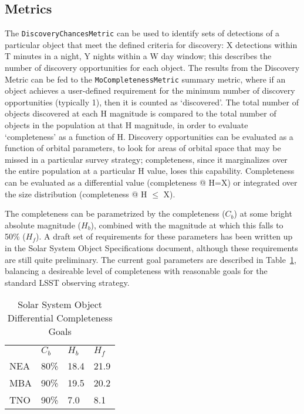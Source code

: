 
\subsection{Metrics}
\label{sec:\secname:metrics}

The {\tt DiscoveryChancesMetric} can be used to identify sets of
detections of a particular object that meet the defined criteria for
discovery: X detections within T minutes in a night, Y nights within a
W day window; this describes the number of discovery opportunities for
each object. The results from the Discovery Metric can be fed to the
{\tt MoCompletenessMetric} summary metric, where if an object achieves
a user-defined requirement for the minimum number of discovery
opportunities (typically 1), then it is counted as `discovered'.  The
total number of objects discovered at each H magnitude is compared to
the total number of objects in the population at that H magnitude, in
order to evaluate `completeness' as a function of H. Discovery
opportunities can be evaluated as a function of orbital parameters, to
look for areas of orbital space that may be missed in a particular
survey strategy; completeness, since it marginalizes over the entire
population at a particular H value, loses this
capability. Completeness can be evaluated as a differential value
(completeness @ H=X) or integrated over the size distribution
(completeness @ H $\leq$ X).

The completeness can be parametrized by the completeness ($C_b$) at
some bright absolute magnitude ($H_b$), combined with the magnitude at
which this falls to 50\% ($H_f$). A draft set of requirements for
these parameters has been written up in the Solar System Object
Specifications document, although these requirements are still quite
preliminary. The current goal parameters are described in Table~\ref{ssoreqs},
balancing a desireable level of completeness with reasonable goals for
the standard LSST observing strategy.

\begin{table}[]
\centering
\caption{Solar System Object Differential Completeness Goals}
\label{ssoreqs}
\begin{tabular}{llll}
    & $C_b$ & $H_b$ & $H_f$ \\
NEA & 80\%  & 18.4  & 21.9  \\
MBA & 90\%  & 19.5  & 20.2  \\
TNO & 90\%  & 7.0   & 8.1
\end{tabular}
\end{table}

